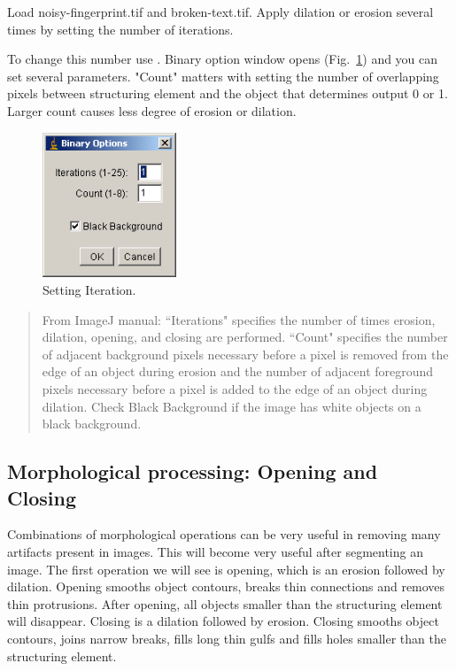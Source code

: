 \begin{indentexercise}{1}
Load noisy-fingerprint.tif and broken-text.tif. Apply dilation or
erosion several times by setting the number of iterations. 

To change this number use . 
Binary option window opens (Fig.~\ref{fig:img67}) and you can set
several parameters. "Count"
matters with setting the number of overlapping pixels between
structuring element and the object that determines output 0 or 1.
Larger count causes less degree of erosion or dilation.

\begin{figure}[htbp]
\begin{center}
\includegraphics[width=4cm]{fig/CMCIBasicCourse201102-img67.png}
\caption{ Setting Iteration.}
\label{fig:img67}
\end{center}
\end{figure}
\end{indentexercise}

\begin{quote}
From ImageJ manual: ``Iterations" specifies the number of times erosion,
dilation, opening, and closing are performed. ``Count" specifies the
number of adjacent background pixels necessary before a pixel is
removed from the edge of an object during erosion and the number of
adjacent foreground pixels necessary before a pixel is added to the
edge of an object during dilation. Check Black Background if the image
has white objects on a black background.
\end{quote}

\subsection{Morphological processing: Opening and Closing}

Combinations of morphological operations can be very useful in removing
many artifacts present in images. This will become very useful after
segmenting an image. The first operation we will see is opening, which
is an erosion followed by dilation. Opening smooths object contours,
breaks thin connections and removes thin protrusions. After opening,
all objects smaller than the structuring element will disappear.
Closing is a dilation followed by erosion. Closing smooths object
contours, joins narrow breaks, fills long thin gulfs and fills holes
smaller than the structuring element.

